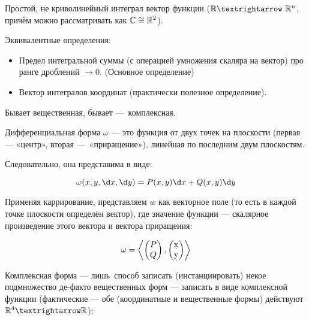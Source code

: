 \documentclass[12pt, a4paper, oneside]{memoir}
\begin{document}
\begin{definition}
    
    Простой, не криволинейный интеграл вектор функции ($\sR → \sR^n$, причём можно рассматривать как ${\mathbb{C}} \cong {\mathbb{R}}^2$).

    Эквивалентные определения:
    \begin{itemize}
        \item Предел интегральной суммы (с операцией умножения скаляра на вектор) про ранге дроблений $→ 0$. (Основное определение)
        \item Вектор интегралов координат (практически полезное определение).
    \end{itemize}
\end{definition}


\begin{definition}
    
    Бывает вещественная, бывает — комплексная.

Дифференциальная форма $\omega$ — это функция от двух точек на плоскости (первая — «центр», вторая — «приращение»), линейная по последним двум плоскостям.

Следовательно, она представима в виде:

\begin{equation}
    \omega(x, y, \d x, \d y) = P(x, y) \d x + Q(x, y) \d y
\end{equation}

Применяя каррирование, представляем $w$ как векторное поле (то есть в каждой точке плоскости определён вектор),
где значение функции — скалярное произведение этого вектора и вектора приращения:

\begin{equation}
    \omega = \left\langle \begin{pmatrix}
        P \\ Q
    \end{pmatrix}, \begin{pmatrix}
        \d x \\ 
        \d y
    \end{pmatrix} \right\rangle
\end{equation}


    Комплексная форма — лишь способ записать (инстанциировать) некое подмножество де-факто вещественных форм —
    записать в виде комплексной функции (фактические — обе (координатные и вещественные формы) действуют $\sR^4 → \sR$):
\end{definition}
\end{document}
